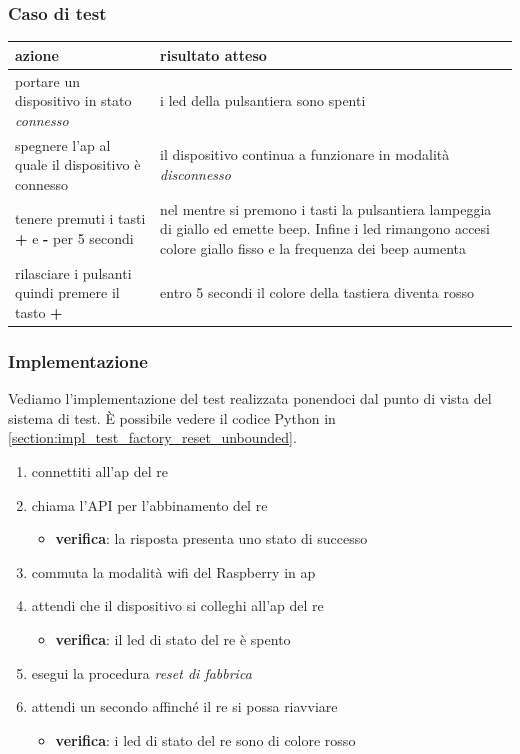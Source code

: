 \documentclass[12pt,a4paper,twoside,titlepage]{book}
\begin{document}
\subsubsection{Caso di test}
\begin{center}
\begin{tabular}{| p{} | p{} |}
    \hline
    \textbf{azione} & \textbf{risultato atteso} \\ \hline
    portare un dispositivo in stato \textit{connesso} & i \acrshort{led} della pulsantiera sono spenti \\ \hline
    spegnere l'\acrshort{ap} al quale il dispositivo è connesso & il dispositivo continua a funzionare in modalità \textit{disconnesso} \\ \hline
    tenere premuti i tasti \textbf{+} e \textbf{-} per 5 secondi & nel mentre si premono i tasti la pulsantiera lampeggia di giallo ed emette beep. Infine i \acrshort{led} rimangono accesi colore giallo fisso e la frequenza dei beep aumenta \\ \hline
    rilasciare i pulsanti quindi premere il tasto \textbf{+} & entro 5 secondi il colore della tastiera diventa rosso \\ \hline
\end{tabular}
\end{center}

\subsubsection{Implementazione}
Vediamo l'implementazione del test realizzata ponendoci dal punto di vista del sistema di test. 
È possibile vedere il codice Python in \autoref{section:impl_test_factory_reset_unbounded}.

\begin{enumerate}
    \item connettiti all'\acrshort{ap} del \acrshort{re}
    \item chiama l'API per l'abbinamento del \acrshort{re} 
    \begin{itemize}
        \item \textbf{verifica}: la risposta presenta uno stato di successo 
    \end{itemize}
    \item commuta la modalità \Gls{wifi} del Raspberry in \acrshort{ap}
    \item attendi che il dispositivo si colleghi all'\acrshort{ap} del \acrshort{re}
    \begin{itemize}
        \item \textbf{verifica}: il  \acrshort{led} di stato del \acrshort{re} è spento 
    \end{itemize}
    \item esegui la procedura \textit{reset di fabbrica}
    \item attendi un secondo affinché il \acrshort{re} si possa riavviare
    \begin{itemize}
        \item \textbf{verifica}: i  \acrshort{led} di stato del \acrshort{re} sono di colore rosso
    \end{itemize}
\end{enumerate}
\end{document}
